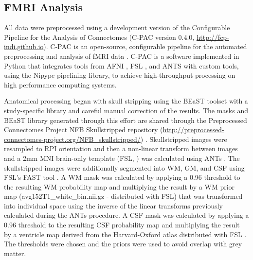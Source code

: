 \subsection{FMRI Analysis}

All data were preprocessed using a development version of the Configurable Pipeline for the Analysis of Connectomes (C-PAC version 0.4.0, \url{http://fcp-indi.github.io}). C-PAC is an open-source, configurable pipeline for the automated preprocessing and analysis of fMRI data \cite{Craddock2013}. C-PAC is a software implemented in Python that integrates tools from AFNI \cite{Cox1996}, FSL \cite{Smith2004}, and ANTS \cite{Avants2008} with custom tools, using the Nipype \cite{Gorgolewski2011} pipelining library, to achieve high-throughput processing on high performance computing systems.

Anatomical processing began with skull stripping using the BEaST toolset \cite{Eskildsen2012} with a study-specific library and careful manual correction of the results. The masks and BEaST library generated through this effort are shared through the Preprocessed Connectomes Project NFB Skullstripped repository (\url{http://preprocessed-connectomes-project.org/NFB_skullstripped/}) \cite{Puccio2016}. Skullstripped images were resampled to RPI orientation and then a non-linear transform between images and a 2mm MNI brain-only template (FSL, \cite{Smith2004}) was calculated using ANTs \cite{Avants2008}. The skullstripped images were additionally segmented into WM, GM, and CSF using FSL’s FAST tool \cite{Zhang2001}. A WM mask was calculated by applying a 0.96 threshold to the resulting WM probability map and multiplying the result by a WM prior map (avg152T1\_white\_bin.nii.gz - distributed with FSL) that was transformed into individual space using the inverse of the linear transforms previously calculated during the ANTs procedure. A CSF mask was calculated by applying a 0.96 threshold to the resulting CSF probability map and multiplying the result by a ventricle map derived from the Harvard-Oxford atlas distributed with FSL \cite{Makris2006}. The thresholds were chosen and the priors were used to avoid overlap with grey matter.

